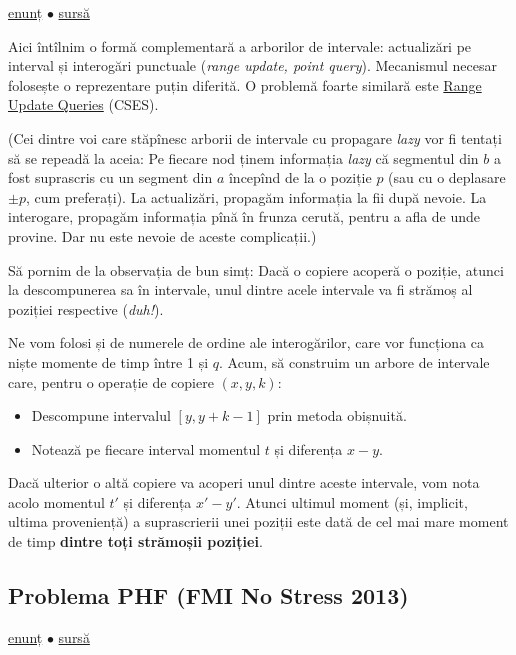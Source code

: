 \documentclass[../main.tex]{subfiles}
\begin{document}
\href{https://codeforces.com/contest/292/problem/E}{enunț}
$\bullet$
\hyperref[code:copying-data]{sursă}

Aici întîlnim o formă complementară a arborilor de intervale: actualizări pe interval și interogări punctuale (\textit{range update, point query}). Mecanismul necesar folosește o reprezentare puțin diferită. O problemă foarte similară este \href{https://cses.fi/problemset/task/1651}{Range Update Queries} (CSES).

(Cei dintre voi care stăpînesc arborii de intervale cu propagare \textit{lazy} vor fi tentați să se repeadă la aceia: Pe fiecare nod ținem informația \textit{lazy} că segmentul din $b$ a fost suprascris cu un segment din $a$ începînd de la o poziție $p$ (sau cu o deplasare $\pm p$, cum preferați). La actualizări, propagăm informația la fii după nevoie. La interogare, propagăm informația pînă în frunza cerută, pentru a afla de unde provine. Dar nu este nevoie de aceste complicații.)

Să pornim de la observația de bun simț: Dacă o copiere acoperă o poziție, atunci la descompunerea sa în intervale, unul dintre acele intervale va fi strămoș al poziției respective (\textit{duh!}).

Ne vom folosi și de numerele de ordine ale interogărilor, care vor funcționa ca niște momente de timp între 1 și $q$. Acum, să construim un arbore de intervale care, pentru o operație de copiere $(x, y, k)$:

\begin{itemize}
  \item Descompune intervalul $[y, y + k - 1]$ prin metoda obișnuită.
  \item Notează pe fiecare interval momentul $t$ și diferența $x-y$.
\end{itemize}

Dacă ulterior o altă copiere va acoperi unul dintre aceste intervale, vom nota acolo momentul $t'$ și diferența $x'-y'$. Atunci ultimul moment (și, implicit, ultima proveniență) a suprascrierii unei poziții este dată de cel mai mare moment de timp \textbf{dintre toți strămoșii poziției}.

\subsection{Problema PHF (FMI No Stress 2013)}
\label{problem:phf}

\href{https://kilonova.ro/problems/3234}{enunț}
$\bullet$
\hyperref[code:phf]{sursă}
\end{document}
